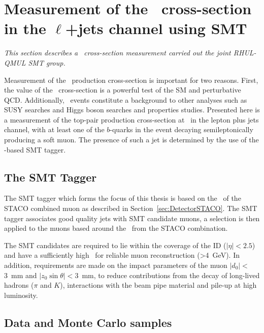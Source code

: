 \newcommand{\Wplus}{\ensuremath{W^{+}}}
\newcommand{\Wminus}{\ensuremath{W^{\minus}}}

\chapter[Measurement of the \ttbar\ cross-section]{Measurement of the \ttbar\ cross-section in the $\ell$+jets channel using SMT} \label{ch:CrossSection}

\textit{This section describes a \ttbar\ cross-section measurement carried out the joint RHUL-QMUL SMT group.}

Measurement of the \ttbar\ production cross-section is important for two reasons. First, the value of the \ttbar\ cross-section is a powerful test of the SM and perturbative QCD. Additionally, \ttbar\ events constitute a background to other analyses such as SUSY searches and Higgs boson searches and properties studies. Presented here is a measurement of the top-pair production cross-section at \cmsS\ in the lepton plus jets channel, with at least one of the $b$-quarks in the event decaying semileptonically producing a soft muon. The presence of such a jet is determined by the use of the \xsm-based SMT tagger.

\section{The SMT Tagger} \label{sec:SMTExplanation}
The SMT tagger which forms the focus of this thesis is based on the \xsm\ of the STACO combined muon as described in Section~\ref{sec:DetectorSTACO}. The SMT tagger associates good quality jets with SMT candidate muons, a selection is then applied to the muons based around the \xsm\ from the STACO combination.

The SMT candidates are required to lie within the coverage of the ID ($|\eta|<2.5$) and have a sufficiently high \pt\ for reliable muon reconstruction (\pt>\SI{4}{\GeV}). In addition, requirements are made on the impact parameters of the muon $|d_{0}|<$\SI{3}{\mm} and $|z_{0}\sin{\theta}|<$\SI{3}{\mm}, to reduce contributions from the decay of long-lived hadrons ($\pi$ and $K$), interactions with the beam pipe material and pile-up at high luminosity.

\section{Data and Monte Carlo samples} \label{sec:CrossSectionSamplesMC}

